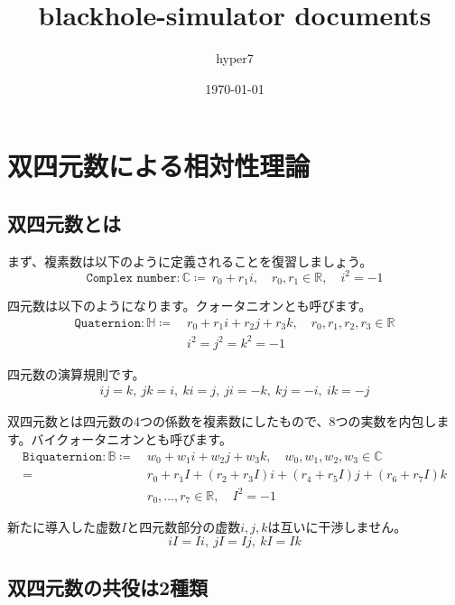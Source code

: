 \documentclass[a4paper,12pt]{jsreport}
\title{blackhole-simulator documents}
\author{hyper7}
\date{\today}
\begin{document}
\maketitle

\chapter{双四元数による相対性理論}

\section{双四元数とは}

まず、複素数は以下のように定義されることを復習しましょう。
\begin{equation}
\texttt{Complex number}:\mathbb{C}\coloneq ~r_0+r_1i,\quad r_0,r_1\in\mathbb{R},\quad i^2=-1
\end{equation}

四元数は以下のようになります。クォータニオンとも呼びます。
\begin{equation}
\begin{split}
\texttt{Quaternion}:\mathbb{H}\coloneq ~&r_0+r_1i+r_2j+r_3k,\quad r_0,r_1,r_2,r_3\in\mathbb{R}\\
&i^2=j^2=k^2=-1
\end{split}
\end{equation}

四元数の演算規則です。
\begin{gather}
ij=k,~jk=i,~ki=j,~ji=-k,~kj=-i,~ik=-j
\end{gather}

双四元数とは四元数の4つの係数を複素数にしたもので、8つの実数を内包します。バイクォータニオンとも呼びます。
\begin{equation}
\begin{split}
\texttt{Biquaternion}:\mathbb{B}\coloneq ~&w_0+w_1i+w_2j+w_3k,\quad w_0,w_1,w_2,w_3\in\mathbb{C}\\
=~&r_0+r_1I+(r_2+r_3I)i+(r_4+r_5I)j+(r_6+r_7I)k\\
&r_0,...,r_7\in\mathbb{R},\quad I^2=-1
\end{split}
\end{equation}

新たに導入した虚数$I$と四元数部分の虚数$i, j, k$は互いに干渉しません。
\begin{equation}
iI=Ii,~jI=Ij,~kI=Ik
\end{equation}

\section{双四元数の共役は2種類}
\end{document}

